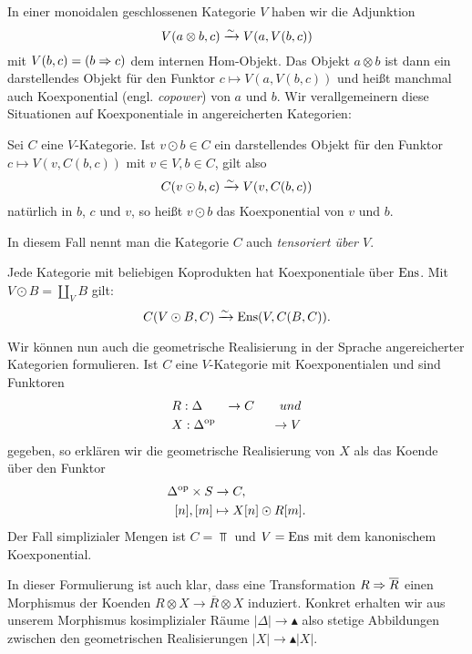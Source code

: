 In einer monoidalen geschlossenen Kategorie $V$ haben wir die Adjunktion
\[ V(a \otimes b, c) \xrightarrow[]{\sim} V(a, V(b, c)) \]
mit $V(b, c) = (b \Rightarrow c)$ dem internen Hom-Objekt. Das Objekt $a
\otimes b$ ist dann ein darstellendes Objekt für den Funktor $c
\mapsto V(a, V(b, c))$ und heißt manchmal auch Koexponential
(engl. \emph{copower}) von $a$ und $b$. Wir verallgemeinern diese
Situationen auf Koexponentiale in angereicherten Kategorien:
\begin{defn} \label{def:copower}
  Sei $C$ eine $V$-Kategorie. Ist $v \odot b \in C$ ein darstellendes
  Objekt für den Funktor $c \mapsto V(v, C(b, c))$ mit $v \in V, b \in
  C$, gilt also
  \[ C(v \odot b, c) \xrightarrow[]{\sim} V(v, C(b, c)) \]
  natürlich in $b$, $c$ und $v$, so heißt $v \odot b$ das
  Koexponential von $v$ und $b$.
\end{defn}
In diesem Fall nennt man die Kategorie $C$ auch \emph{tensoriert über
  $V$}.
\begin{bsp} \label{ens-tensored}
  Jede Kategorie mit beliebigen Koprodukten hat Koexponentiale über
  $\operatorname{Ens}$. Mit $V \odot B = \coprod_V B$ gilt:
  \[ C(V \odot B, C) \xrightarrow[]{\sim} \operatorname{Ens}(V, C(B, C)). \]
\end{bsp}

Wir können nun auch die geometrische Realisierung in der Sprache
angereicherter Kategorien formulieren. Ist $C$ eine $V$-Kategorie mit
Koexponentialen und sind Funktoren
\begin{align*}
  &R: \Delta &\to C \qquad{und} \\
  &X: \Delta^\mathrm{op} &\to V
\end{align*}
gegeben, so erklären wir die geometrische Realisierung von $X$ als das
Koende über den Funktor
\begin{align*}
  \Delta^\mathrm{op} \times S &\to C, \\
  [n], [m] &\mapsto X[n] \odot R[m].
\end{align*}
Der Fall simplizialer Mengen ist $C = \Top$ und $V = \operatorname{Ens}$ mit dem
kanonischem Koexponential.

\begin{bem} \label{real-model-natural}
  In dieser Formulierung ist auch klar, dass eine Transformation $R
  \Rightarrow \overline{R}$ einen Morphismus der Koenden $R \otimes X \to
  \overline{R} \otimes X$ induziert. Konkret erhalten wir aus unserem
  Morphismus kosimplizialer Räume $|\Delta| \to \blacktriangle$ also
  stetige Abbildungen zwischen den geometrischen Realisierungen $|X|
  \to \blacktriangle |X|$.
\end{bem}

